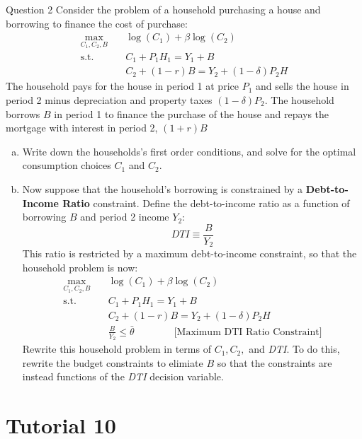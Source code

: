 \documentclass[a4paper]{article}
\newif\IfInSansMode
\begin{document}
	\begin{questionbox}{Question 2}
		Consider the problem of a household purchasing a house and borrowing to finance the cost of purchase:
		\begin{align*}
			\max_{C_1,C_2,B}\quad &\log (C_1) +\beta\log(C_2)\\
			\text{s.t.}\quad &C_1+P_1H_1=Y_1+B\\
			& C_2 + (1-r)B = Y_2+(1-\delta) P_2H
		\end{align*}
		The household pays for the house in period 1 at price \( P_1 \) and sells the house in period 2 minus depreciation and property taxes \( (1-\delta)P_2 \). The household borrows \( B \) in period 1 to finance the purchase of the house and repays the mortgage with interest in period 2, \( (1+r)B \)
		\begin{enumerate}[(a)]
			\item Write down the households's first order conditions, and solve for the optimal consumption choices \( C_1 \) and \( C_2 \).
			\item Now suppose that the household's borrowing is constrained by a \textbf{Debt-to-Income Ratio} constraint. Define the debt-to-income ratio as a function of borrowing \( B \) and period 2 income \( Y_2 \):
			\[
				DTI \equiv \frac{B}{Y_2}
			\]
			This ratio is restricted by a maximum debt-to-income constraint, so that the household problem is now:
			\begin{align*}
				\max_{C_1,C_2,B}\quad &\log (C_1) +\beta\log(C_2)\\
				\text{s.t.}\quad &C_1+P_1H_1=Y_1+B\\
				& C_2 + (1-r)B = Y_2+(1-\delta) P_2H\\
				& \frac{B}{Y_2} \leq \bar{\theta} \qquad\qquad \text{[Maximum DTI Ratio Constraint]}
			\end{align*}
			Rewrite this household problem in terms of \( C_1,C_2, \) and \textit{DTI}. To do this, rewrite the budget constraints to elimiate \( B \) so that the constraints are instead functions of the \textit{DTI} decision variable.
		\end{enumerate}
	\end{questionbox}
\section{Tutorial 10}\pagebreak
\end{document}
